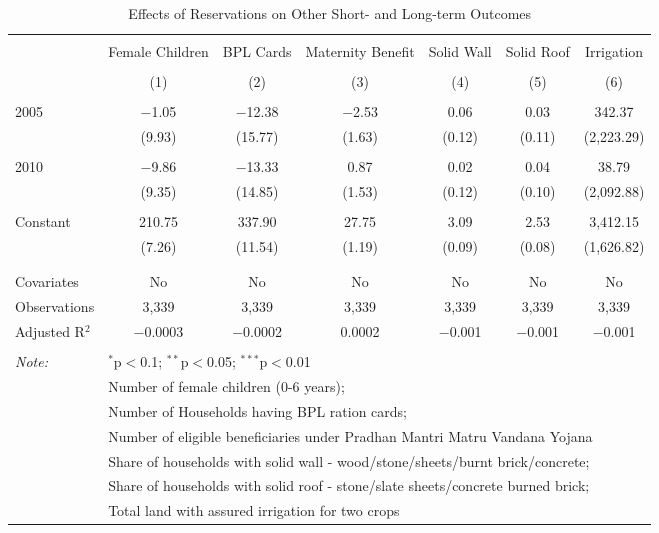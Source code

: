 
\begin{table}[!htbp] \centering 
  \caption{Effects of Reservations on Other Short- and Long-term Outcomes} 
  \label{raj_shrug_other_05_10} 
\scriptsize 
\begin{tabular}{@{\extracolsep{5pt}}lcccccc} 
\\[-1.8ex]\hline 
\hline \\[-1.8ex] 
 & Female Children & BPL Cards & Maternity Benefit & Solid Wall & Solid Roof & Irrigation \\ 
\\[-1.8ex] & (1) & (2) & (3) & (4) & (5) & (6)\\ 
\hline \\[-1.8ex] 
 2005 & $-$1.05 & $-$12.38 & $-$2.53 & 0.06 & 0.03 & 342.37 \\ 
  & (9.93) & (15.77) & (1.63) & (0.12) & (0.11) & (2,223.29) \\ 
  & & & & & & \\ 
 2010 & $-$9.86 & $-$13.33 & 0.87 & 0.02 & 0.04 & 38.79 \\ 
  & (9.35) & (14.85) & (1.53) & (0.12) & (0.10) & (2,092.88) \\ 
  & & & & & & \\ 
 Constant & 210.75 & 337.90 & 27.75 & 3.09 & 2.53 & 3,412.15 \\ 
  & (7.26) & (11.54) & (1.19) & (0.09) & (0.08) & (1,626.82) \\ 
  & & & & & & \\ 
\hline \\[-1.8ex] 
Covariates & No & No & No & No & No & No \\ 
Observations & 3,339 & 3,339 & 3,339 & 3,339 & 3,339 & 3,339 \\ 
Adjusted R$^{2}$ & $-$0.0003 & $-$0.0002 & 0.0002 & $-$0.001 & $-$0.001 & $-$0.001 \\ 
\hline 
\hline \\[-1.8ex] 
\textit{Note:}  & \multicolumn{6}{l}{$^{*}$p$<$0.1; $^{**}$p$<$0.05; $^{***}$p$<$0.01} \\ 
 & \multicolumn{6}{l}{Number of female children (0-6 years);} \\ 
 & \multicolumn{6}{l}{Number of Households having BPL ration cards;} \\ 
 & \multicolumn{6}{l}{Number of eligible beneficiaries under Pradhan Mantri Matru Vandana Yojana} \\ 
 & \multicolumn{6}{l}{Share of households with solid wall - wood/stone/sheets/burnt brick/concrete;} \\ 
 & \multicolumn{6}{l}{Share of households with solid roof - stone/slate sheets/concrete burned brick;} \\ 
 & \multicolumn{6}{l}{Total land with assured irrigation for two crops} \\ 
\end{tabular} 
\end{table} 
